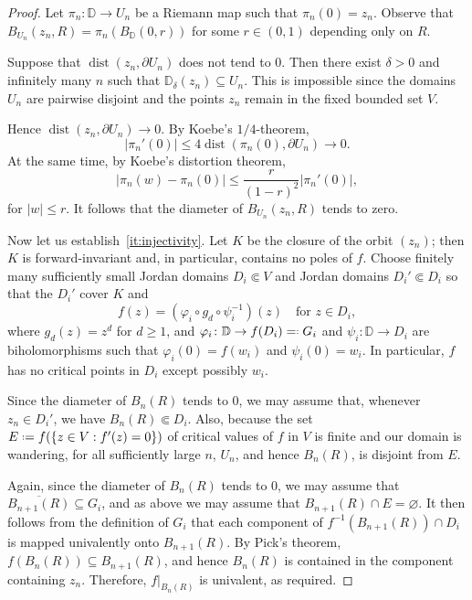 \documentclass[12pt,a4paper,reqno]{amsart}
\theoremstyle{plain}
\renewcommand{\subset}{\subseteq}
\theoremstyle{definition}
\theoremstyle{remark}
\newcommand{\dist}{\operatorname{dist}}
\numberwithin{equation}{section}
\newcommand \D{\mathbb{D}}
\newcommand*{\defeq}{\mathrel{\vcenter{\baselineskip0.5ex \lineskiplimit0pt
                     \hbox{\scriptsize.}\hbox{\scriptsize.}}}%
                     =}
\newcommand{\eqdef}{=\mathrel{\vcenter{\baselineskip0.5ex \lineskiplimit0pt
                     \hbox{\scriptsize.}\hbox{\scriptsize.}}}}
\begin{document}
\begin{proof}

    Let $\pi_n\colon \D \to U_n$ be a Riemann map such that $\pi_n(0) = z_n$. Observe that $B_{U_n}(z_n, R) = \pi_n(B_{\D}(0, r))$ for some $r \in (0,1)$ depending only on $R$.

    Suppose that $\dist(z_n,\partial U_n)$ does not tend to $0$. Then there exist $\delta>0$ and infinitely many $n$ such that $\D_\delta(z_n)\subset U_n$. This is
    impossible since the domains $U_n$ are pairwise disjoint and  the points $z_n$ remain in the fixed bounded set $V$.

    Hence $\dist(z_n,\partial U_n)\to0$. By Koebe's $1/4$-theorem,
    $$
    |\pi_n'(0)| \leq 4\dist(\pi_n(0),\partial U_n)\to0.
    $$
    At the same time, by Koebe's distortion theorem,
    $$
    |\pi_n(w)-\pi_n(0)| \leq \frac{r}{(1-r)^2}|\pi_n'(0)|,
    $$
    for $|w|\leq r$. It follows that the diameter of $B_{U_n}(z_n,R)$ tends to zero.

    Now let us establish~\ref{it:injectivity}. Let $K$ be the closure of the orbit $(z_n)$;
    then $K$ is forward-invariant and, in
    particular, contains no poles of $f$. Choose finitely many sufficiently small Jordan domains $D_i \Subset V$ and Jordan domains $D_i' \Subset D_i$ so
    that the $D_i'$ cover $K$ and
    $$
    f(z) = (\varphi_i \circ g_d \circ \psi_i^{-1})(z) \quad \text{for } z \in D_i,
    $$
    where $g_d(z) = z^d$ for $d \geq 1$, and $\varphi_i\colon \D \to f(D_i) \eqdef G_i$ and $\psi_i\colon \D \to D_i$ are biholomorphisms such that $\varphi_i(0) = f(w_i)$ and $\psi_i(0) = w_i$. In particular, $f$ has no critical points in $D_i$ 
    except possibly $w_i$. 

    Since the diameter of $B_n(R)$ tends to $0$, we may assume that, whenever $z_n \in D_i'$, we have $B_n(R) \Subset D_i$. Also, because
    the  set $E \defeq f(\{z \in V : f'(z) = 0\})$ of critical values of $f$ in $V$
     is finite and our domain
    is wandering, for all sufficiently large $n$, $U_n$, and hence $B_n(R)$, is disjoint from $E$.

    Again, since the diameter of $B_n(R)$ tends to $0$, we may assume that $\overline{B_{n+1}(R)} \subset G_i$, and as above 
    we may assume that 
    $B_{n+1}(R) \cap E = \varnothing$. It then follows from the definition of $G_i$ that each component of $f^{-1}(B_{n+1}(R)) \cap D_i$ is mapped univalently onto $B_{n+1}(R)$. By Pick's theorem, $f(B_n(R)) \subset B_{n+1}(R)$, and hence $B_n(R)$ is contained in the component containing $z_n$. Therefore, $f|_{B_n(R)}$ is univalent, as required.
\end{proof}
\end{document}
